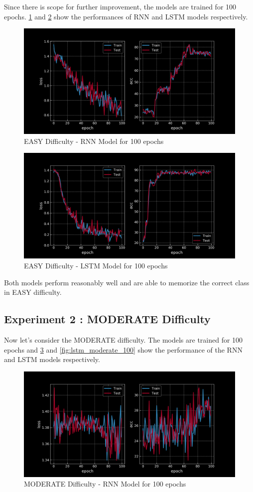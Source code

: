 Since there is scope for further improvement, the models are trained for 100 epochs. 
\cref{fig:rnn_easy_100} and \cref{fig:lstm_easy_100} show the performances of RNN and LSTM models respectively.

\begin{figure}[H]
    \centering
    \includegraphics[width=0.5\linewidth]{figs/rnn_easy_100.png}
    \caption{EASY Difficulty - RNN Model for 100 epochs}
    \label{fig:rnn_easy_100}
\end{figure}

\begin{figure}[H]
    \centering
    \includegraphics[width=0.5\linewidth]{figs/lstm_easy_100.png}
    \caption{EASY Difficulty - LSTM Model for 100 epochs}
    \label{fig:lstm_easy_100}
\end{figure}
Both models perform reasonably well and are able to memorize the correct class in EASY difficulty. 

\subsection{Experiment 2 : MODERATE Difficulty}
Now let's consider the MODERATE difficulty. The models are trained for 100 epochs and \cref{fig:rnn_moderate_100} and \cref{fig:lstm_moderate_100} show the performance of the RNN and LSTM models respectively.

\begin{figure}[H]
    \centering
    \includegraphics[width=0.5\linewidth]{figs/rnn_moderate_100.png}
    \caption{MODERATE Difficulty - RNN Model for 100 epochs}
    \label{fig:rnn_moderate_100}
\end{figure}

